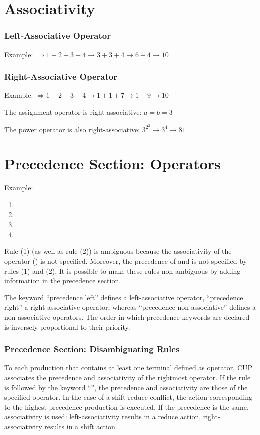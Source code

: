 \section{Associativity}
\subsubsection{Left-Associative Operator}
Example:
 $\Rightarrow 1 + 2 + 3 + 4 \to 3 + 3 + 4 \to 6 + 4 \to 10$

\subsubsection{Right-Associative Operator}
Example:
 $\Rightarrow 1 + 2 + 3 + 4 \to 1 + 1 + 7 \to 1 + 9 \to 10$

The assignment operator  is right-associative: $a = b = 3$

The power operator is also right-associative: $3^{2^{2}} \to 3^4 \to 81$

\section{Precedence Section: Operators}
Example:
\begin{enumerate}
    \item
    \item
    \item
    \item
\end{enumerate}
Rule (1) (as well as rule (2)) is ambiguous because the associativity of the operator  () is not specified.
Moreover, the precedence of  and  is not specified by rules (1) and (2).
It is possible to make these rules non ambiguous by adding information in the precedence section.

The keyword ``precedence left'' defines a left-associative operator, ``precedence right'' a right-associative operator, whereas ``precedence non associative'' defines a non-associative operators.
The order in which precedence keywords are declared is inversely proportional to their priority.

\subsubsection{Precedence Section: Disambiguating Rules}
To each production that contains at least one terminal defined as operator, CUP associates the precedence and associativity of the rightmost operator.
If the rule is followed by the keyword ``'', the precedence and associativity are those of the specified operator.
In the case of a shift-reduce conflict, the action corresponding to the highest precedence production is executed.
If the precedence is the same, associativity is used: left-associativity results in a reduce action, right-associativity results in a shift action.

